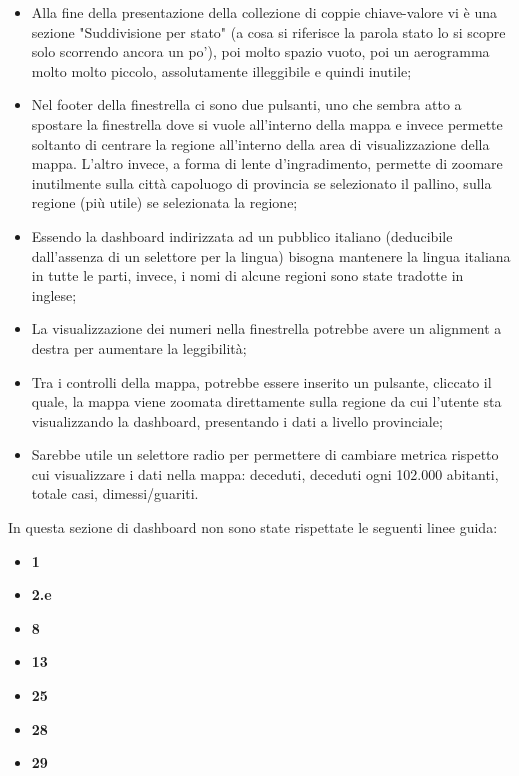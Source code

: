 \begin{itemize}
    \item Alla fine della presentazione della collezione di coppie chiave-valore vi è una sezione "Suddivisione per stato" (a cosa si riferisce la parola stato lo si scopre solo scorrendo ancora un po'), poi molto spazio vuoto, poi un aerogramma molto molto piccolo, assolutamente illeggibile e quindi inutile;
    \item Nel footer della finestrella ci sono due pulsanti, uno che sembra atto a spostare la finestrella dove si vuole all'interno della mappa e invece permette soltanto di centrare la regione all'interno della area di visualizzazione della mappa. L'altro invece, a forma di lente d'ingradimento, permette di zoomare inutilmente sulla città capoluogo di provincia se selezionato il pallino, sulla regione (più utile) se selezionata la regione;
    \item Essendo la dashboard indirizzata ad un pubblico italiano (deducibile dall'assenza di un selettore per la lingua) bisogna mantenere la lingua italiana in tutte le parti, invece, i nomi di alcune regioni sono state tradotte in inglese;
    \item La visualizzazione dei numeri nella finestrella potrebbe avere un alignment a destra per aumentare la leggibilità;
    \item Tra i controlli della mappa, potrebbe essere inserito un pulsante, cliccato il quale, la mappa viene zoomata direttamente sulla regione da cui l'utente sta visualizzando la dashboard, presentando i dati a livello provinciale;
    \item Sarebbe utile un selettore radio per permettere di cambiare metrica rispetto cui visualizzare i dati nella mappa: deceduti, deceduti ogni 102.000 abitanti, totale casi, dimessi/guariti.
\end{itemize}
In questa sezione di dashboard non sono state rispettate le seguenti linee guida:
\begin{itemize}
    \item \textbf{1}
    \item \textbf{2.e}
    \item \textbf{8}
    \item \textbf{13}
    \item \textbf{25}
    \item \textbf{28}
    \item \textbf{29}
\end{itemize}

